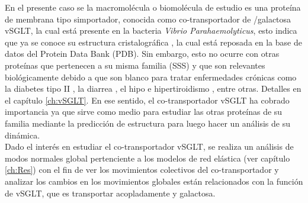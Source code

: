 En el presente caso se la macromol\'{e}cula o biomol\'{e}cula de estudio es una prote\'{i}na de membrana tipo simportador, conocida como co-transportador de /galactosa vSGLT, la cual est\'{a} presente en la bacteria \textit{Vibrio Parahaemolyticus}, esto indica que ya se conoce su estructura cristalogr\'{a}fica \cite{Faham2008}, la cual est\'{a} reposada en la base de datos del Protein Data Bank (PDB). Sin embargo, esto no ocurre con otras prote\'{i}nas que pertenecen a su misma familia (SSS) y que son relevantes biol\'{o}gicamente debido a que son blanco  para tratar enfermedades cr\'{o}nicas como la diabetes tipo II \cite{Bisha2014}, la diarrea \cite{Hamilton2013}, el hipo e hipertiroidismo \cite{Ferrandino2016}, entre otras. Detalles en el cap\'{i}tulo \ref{ch:vSGLT}. En ese sentido, el co-transportador vSGLT ha cobrado importancia ya que sirve como medio para estudiar las otras prote\'{i}nas de su familia mediante la predicci\'{o}n de estructura para luego hacer un an\'{a}lisis de su din\'{a}mica.\\

Dado el inter\'{e}s en estudiar el co-transportador vSGLT, se realiza un an\'{a}lisis de modos normales global pertenciente a los modelos de red el\'{a}stica (ver cap\'{i}tulo \ref{ch:Res}) con el fin de ver los movimientos colectivos del co-transportador y analizar los cambios en los movimientos globales est\'{a}n relacionados con la funci\'{o}n de vSGLT, que es transportar acopladamente  y galactosa.
